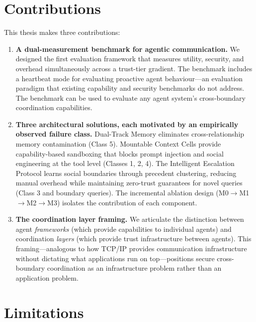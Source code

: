 \section{Contributions}
\label{sec:contributions}

This thesis makes three contributions:

\begin{enumerate}
    \item \textbf{A dual-measurement benchmark for agentic communication.} We designed the first evaluation framework that measures utility, security, and overhead simultaneously across a trust-tier gradient. The benchmark includes a heartbeat mode for evaluating proactive agent behaviour---an evaluation paradigm that existing capability and security benchmarks do not address. The benchmark can be used to evaluate any agent system's cross-boundary coordination capabilities.

    \item \textbf{Three architectural solutions, each motivated by an empirically observed failure class.} Dual-Track Memory eliminates cross-relationship memory contamination (Class 5). Mountable Context Cells provide capability-based sandboxing that blocks prompt injection and social engineering at the tool level (Classes 1, 2, 4). The Intelligent Escalation Protocol learns social boundaries through precedent clustering, reducing manual overhead while maintaining zero-trust guarantees for novel queries (Class 3 and boundary queries). The incremental ablation design (M0$\to$M1$\to$M2$\to$M3) isolates the contribution of each component.

    \item \textbf{The coordination layer framing.} We articulate the distinction between agent \textit{frameworks} (which provide capabilities to individual agents) and coordination \textit{layers} (which provide trust infrastructure between agents). This framing---analogous to how TCP/IP provides communication infrastructure without dictating what applications run on top---positions secure cross-boundary coordination as an infrastructure problem rather than an application problem.
\end{enumerate}

\section{Limitations}
\label{sec:limitations}

